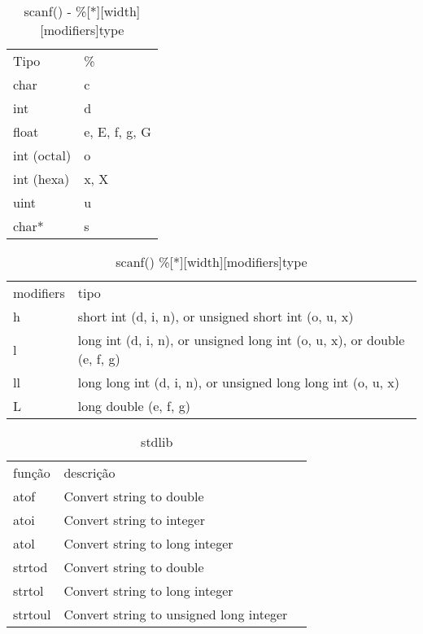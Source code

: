 \documentclass[a4paper,twocolumn, 10pt, landscape]{article}
\begin{document}
\begin{table}
\begin{tabular}{ll}
Tipo & \% \\ 
char & c \\ 
int & d \\ 
float & e, E, f, g, G \\ 
int (octal) & o \\ 
int (hexa) & x, X \\ 
uint & u \\ 
char* & s
\end{tabular}
\caption{scanf() - \%[*][width][modifiers]type}
\label{tipos}
\end{table}

\begin{table}
 \begin{tabular}{ll}
modifiers & tipo \\ 
h & short int (d, i, n), or unsigned short int (o, u, x) \\ 
l & long int (d, i, n), or unsigned long int (o, u, x), or double (e, f, g) \\ 
ll & long long int (d, i, n), or unsigned long long int (o, u, x) \\ 
L & long double (e, f, g) \\ 
\end{tabular}
\caption{scanf() \%[*][width][modifiers]type}
\label{modifiers}
\end{table}


\begin{table}
 \begin{tabular}{lll}
função & descrição \\
atof & Convert string to double \\
atoi & Convert string to integer \\
atol & Convert string to long integer \\
strtod & Convert string to double \\
strtol & Convert string to long integer \\
strtoul & Convert string to unsigned long integer \\
\end{tabular}
\caption{stdlib}
\label{stdlib functions}
\end{table}
\end{document}
